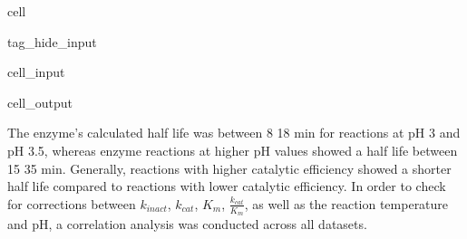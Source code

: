 \documentclass[letterpaper,12pt,english]{jupyterBook}
\begin{document}
\begin{sphinxuseclass}{cell}
\begin{sphinxuseclass}{tag_hide_input}
\begin{sphinxVerbatimInput}
\begin{sphinxuseclass}{cell_input}
\end{sphinxuseclass}\end{sphinxVerbatimInput}
\begin{sphinxVerbatimOutput}

\begin{sphinxuseclass}{cell_output}
\noindent{}

\end{sphinxuseclass}\end{sphinxVerbatimOutput}

\end{sphinxuseclass}
\end{sphinxuseclass}
\sphinxAtStartPar
The enzyme’s calculated half life was between 8 \sphinxhyphen{} 18 min for reactions at pH 3 and pH 3.5, whereas enzyme reactions at higher pH values showed a half life between 15 \sphinxhyphen{} 35 min. Generally, reactions with higher catalytic efficiency showed a shorter half life compared to reactions with lower catalytic efficiency.
In order to check for corrections between \(k_{inact}\), \(k_{cat}\), \(K_{m}\), \(\frac{k_{cat}}{K_{m}}\), as well as the reaction temperature and pH, a correlation analysis was conducted across all datasets.
\end{document}
